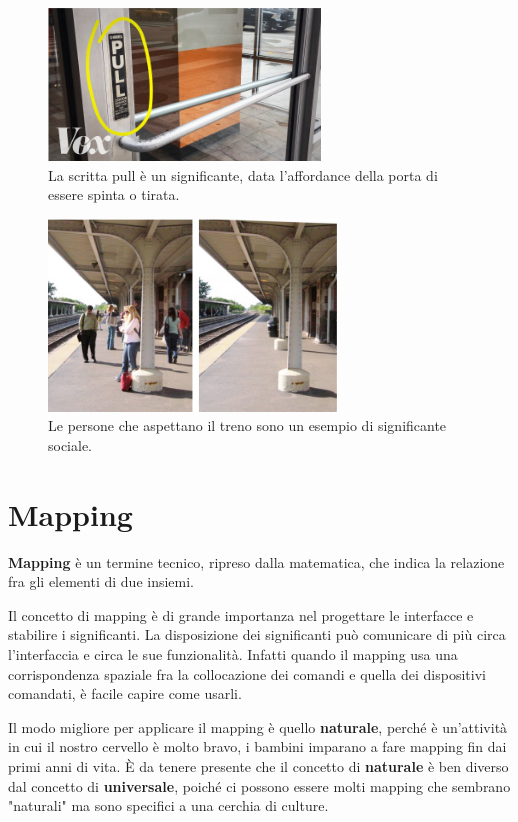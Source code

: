\documentclass[a4paper,11pt,oneside]{book}
\begin{document}
\pagebreak

\begin{figure}[!h]
	\centering
	\includegraphics[scale = 0.7]{immagini/sign.png}
	\caption{La scritta pull è un significante, data l'affordance della porta di essere spinta o tirata.}
\end{figure}
\begin{figure}[!h]
	\centering
	\includegraphics[scale = 0.7]{immagini/sign1.png}
	\caption{Le persone che aspettano il treno sono un esempio di significante sociale.}
\end{figure}

\section{Mapping}
\textbf{Mapping} è un termine tecnico, ripreso dalla matematica, che indica la relazione fra gli elementi di due insiemi.

Il concetto di mapping è di grande importanza nel progettare le interfacce e stabilire i significanti. La disposizione dei significanti può comunicare di più circa l'interfaccia e circa le sue funzionalità. Infatti quando il mapping usa una corrispondenza spaziale fra la collocazione dei comandi e quella dei dispositivi comandati, è facile capire come usarli.

Il modo migliore per applicare il mapping è quello \textbf{naturale}, perché è un'attività in cui il nostro cervello è molto bravo, i bambini imparano a fare mapping fin dai primi anni di vita. È da tenere presente che il concetto di \textbf{naturale} è ben diverso dal concetto di \textbf{universale}, poiché ci possono essere molti mapping che sembrano "naturali" ma sono specifici a una cerchia di culture.
\end{document}
